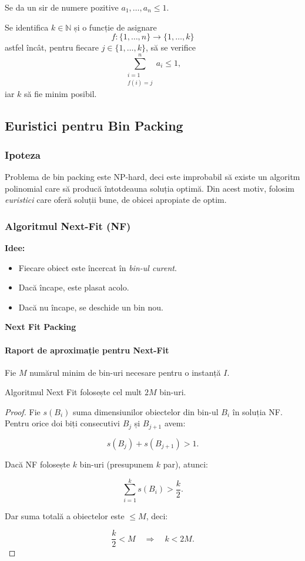 \documentclass[runningheads]{llncs}
\begin{document}
	Se da un sir de numere pozitive $a_1, \dots, a_n \le 1.$

	Se identifica $k \in \mathbb{N}$ și o funcție de asignare \[ f : \{1, \dots, n\} \to \{1, \dots, k\} \] astfel încât, pentru fiecare $j \in \{1, \dots, k\}$, să se verifice \[ \sum_{\substack{i = 1 \\ f(i) = j}}^{n} a_i \le 1, \] iar $k$ să fie minim posibil.

	\subsection{Euristici pentru Bin Packing}

	\subsubsection{Ipoteza}
	Problema de bin packing este NP-hard, deci este improbabil să existe un algoritm polinomial care să producă întotdeauna soluția optimă.
	Din acest motiv, folosim \emph{euristici} care oferă soluții bune, de obicei apropiate de optim.

	\subsubsection{Algoritmul Next-Fit (NF)}

	\textbf{Idee:}
	\begin{itemize}
		\item Fiecare obiect este încercat în \emph{bin-ul curent}.
		\item Dacă încape, este plasat acolo.
		\item Dacă nu încape, se deschide un bin nou.
	\end{itemize}

	\begin{center}
		\textbf{Next Fit Packing}
	\end{center}

	\paragraph{Raport de aproximație pentru Next-Fit}

	Fie $M$ numărul minim de bin-uri necesare pentru o instanță $I$.

	\begin{theorem}
		Algoritmul Next Fit folosește cel mult $2M$ bin-uri.
	\end{theorem}

	\begin{proof}
		Fie $s(B_i)$ suma dimensiunilor obiectelor din bin-ul $B_i$ în soluția NF.
		Pentru orice doi biți consecutivi $B_j$ și $B_{j+1}$ avem:


		\[
		s(B_j) + s(B_{j+1}) > 1.
		\]


		Dacă NF folosește $k$ bin-uri (presupunem $k$ par), atunci:


		\[
		\sum_{i=1}^{k} s(B_i) > \frac{k}{2}.
		\]


		Dar suma totală a obiectelor este $\le M$, deci:


		\[
		\frac{k}{2} < M \quad \Rightarrow \quad k < 2M.
		\]


	\end{proof}
\end{document}
